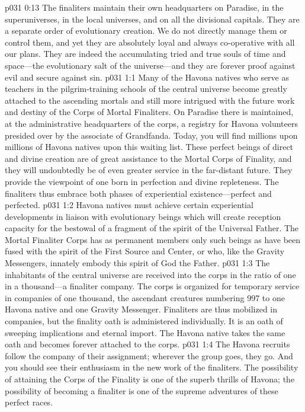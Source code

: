 \vs p031 0:13 The finaliters maintain their own headquarters on Paradise, in the superuniverses, in the local universes, and on all the divisional capitals. They are a separate order of evolutionary creation. We do not directly manage them or control them, and yet they are absolutely loyal and always co\hyp{}operative with all our plans. They are indeed the accumulating tried and true souls of time and space---the evolutionary salt of the universe---and they are forever proof against evil and secure against sin.
\vs p031 1:1 Many of the Havona natives who serve as teachers in the pilgrim\hyp{}training schools of the central universe become greatly attached to the ascending mortals and still more intrigued with the future work and destiny of the Corps of Mortal Finaliters. On Paradise there is maintained, at the administrative headquarters of the corps, a registry for Havona volunteers presided over by the associate of Grandfanda. Today, you will find millions upon millions of Havona natives upon this waiting list. These perfect beings of direct and divine creation are of great assistance to the Mortal Corps of Finality, and they will undoubtedly be of even greater service in the far\hyp{}distant future. They provide the viewpoint of one born in perfection and divine repleteness. The finaliters thus embrace both phases of experiential existence---perfect and perfected.
\vs p031 1:2 Havona natives must achieve certain experiential developments in liaison with evolutionary beings which will create reception capacity for the bestowal of a fragment of the spirit of the Universal Father. The Mortal Finaliter Corps has as permanent members only such beings as have been fused with the spirit of the First Source and Center, or who, like the Gravity Messengers, innately embody this spirit of God the Father.
\vs p031 1:3 The inhabitants of the central universe are received into the corps in the ratio of one in a thousand---a finaliter company. The corps is organized for temporary service in companies of one thousand, the ascendant creatures numbering 997 to one Havona native and one Gravity Messenger. Finaliters are thus mobilized in companies, but the finality oath is administered individually. It is an oath of sweeping implications and eternal import. The Havona native takes the same oath and becomes forever attached to the corps.
\vs p031 1:4 The Havona recruits follow the company of their assignment; wherever the group goes, they go. And you should see their enthusiasm in the new work of the finaliters. The possibility of attaining the Corps of the Finality is one of the superb thrills of Havona; the possibility of becoming a finaliter is one of the supreme adventures of these perfect races.
